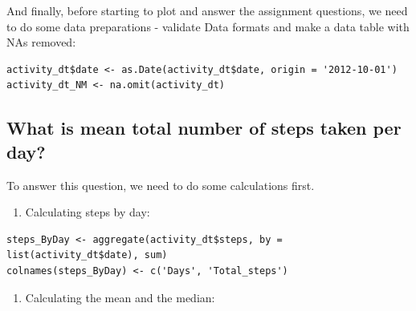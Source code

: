 \documentclass[
]{article}
\newenvironment{Shaded}{\begin{snugshade}}{\end{snugshade}}
\newcommand{\DataTypeTok}[1]{\textcolor[rgb]{0.13,0.29,0.53}{#1}}
\newcommand{\DecValTok}[1]{\textcolor[rgb]{0.00,0.00,0.81}{#1}}
\newcommand{\KeywordTok}[1]{\textcolor[rgb]{0.13,0.29,0.53}{\textbf{#1}}}
\newcommand{\NormalTok}[1]{#1}
\newcommand{\OperatorTok}[1]{\textcolor[rgb]{0.81,0.36,0.00}{\textbf{#1}}}
\newcommand{\OtherTok}[1]{\textcolor[rgb]{0.56,0.35,0.01}{#1}}
\newcommand{\StringTok}[1]{\textcolor[rgb]{0.31,0.60,0.02}{#1}}
\providecommand{\tightlist}{%
  \setlength{\itemsep}{0pt}\setlength{\parskip}{0pt}}
\begin{document}
And finally, before starting to plot and answer the assignment
questions, we need to do some data preparations - validate Data formats
and make a data table with NAs removed:

\begin{verbatim}
activity_dt$date <- as.Date(activity_dt$date, origin = '2012-10-01')
activity_dt_NM <- na.omit(activity_dt)
\end{verbatim}

\hypertarget{what-is-mean-total-number-of-steps-taken-per-day}{%
\subsection{What is mean total number of steps taken per
day?}\label{what-is-mean-total-number-of-steps-taken-per-day}}

To answer this question, we need to do some calculations first.

\begin{enumerate}
\def\labelenumi{\arabic{enumi}.}
\tightlist
\item
  Calculating steps by day:
\end{enumerate}

\begin{verbatim}
steps_ByDay <- aggregate(activity_dt$steps, by = list(activity_dt$date), sum)
colnames(steps_ByDay) <- c('Days', 'Total_steps')
\end{verbatim}

\begin{enumerate}
\def\labelenumi{\arabic{enumi}.}
\setcounter{enumi}{1}
\tightlist
\item
  Calculating the mean and the median:
\end{enumerate}

\begin{Shaded}
\end{Shaded}
\end{document}
